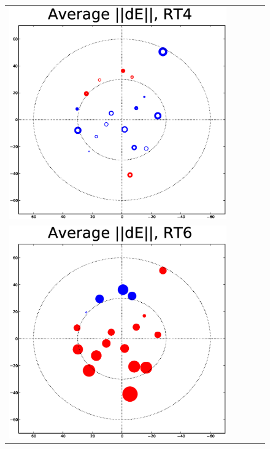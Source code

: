 \documentclass[]{article}
\begin{document}
\begin{figure}
\begin{tabular}{@{}c@{}c@{}c@{}c@{}c@{}}
\includegraphics[width=\roguewidth]{qmc2b_dE_ant4} \\
\includegraphics[width=\roguewidth]{qmc2b_dE_ant6} &

\end{tabular}
\end{figure}
\end{document}
